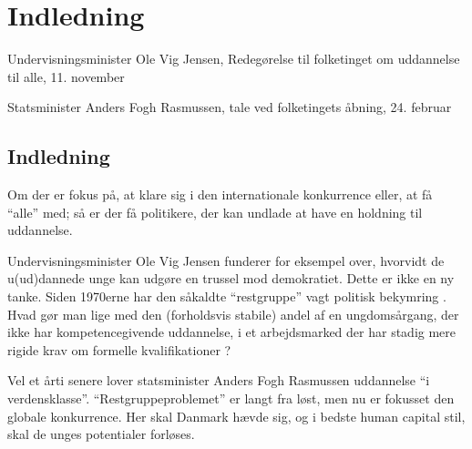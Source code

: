 \part{Indledning}\label{part:intro}
\begin{epigraphs}
{Undervisningsminister Ole Vig Jensen, Redegørelse til folketinget om uddannelse til alle, 11. november \citeyear{jensenRedegorelseR319931993}}

{Statsminister Anders Fogh Rasmussen, tale ved folketingets åbning, 24. februar \citeyear{rasmussenStatsministerAndersFogh2005}}
\end{epigraphs}

\chapter{Indledning}\label{chap:intro}

 Om der er fokus på, at klare sig i den internationale konkurrence eller, at få “alle” med; så er der få politikere, der kan undlade at have en holdning til uddannelse.

Undervisningsminister Ole Vig Jensen funderer for eksempel over, hvorvidt de u(ud)dannede unge kan udgøre en trussel mod demokratiet.
Dette er ikke en ny tanke. Siden 1970erne har den såkaldte “restgruppe” vagt politisk bekymring \autocite{hansenRestgruppen2004}.
Hvad gør man lige med den (forholdsvis stabile) andel af en ungdomsårgang, der ikke har kompetencegivende uddannelse, i et arbejdsmarked der har stadig mere rigide krav om formelle kvalifikationer \autocite{dpuNyhedsbrevUddannelseKan2001}?

 Vel et årti senere lover statsminister Anders Fogh Rasmussen uddannelse “i verdensklasse”. “Restgruppeproblemet” er langt fra løst, men nu er fokusset den globale konkurrence.
 Her skal Danmark hævde sig, og i bedste human capital stil, skal de unges potentialer forløses.

